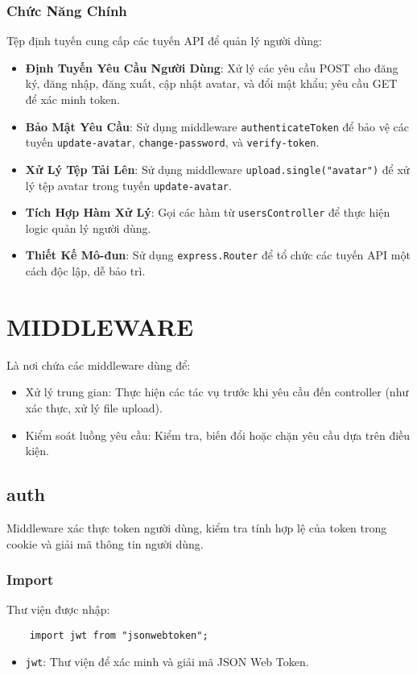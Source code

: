             \subsubsection{Chức Năng Chính}
                \hspace*{0.6cm}Tệp định tuyến cung cấp các tuyến API để quản lý người dùng:
                \begin{itemize}
                    \item \textbf{Định Tuyến Yêu Cầu Người Dùng}: Xử lý các yêu cầu POST cho đăng ký, đăng nhập, đăng xuất, cập nhật avatar, và đổi mật khẩu; yêu cầu GET để xác minh token.
                    \item \textbf{Bảo Mật Yêu Cầu}: Sử dụng middleware \texttt{authenticateToken} để bảo vệ các tuyến \texttt{update-avatar}, \texttt{change-password}, và \texttt{verify-token}.
                    \item \textbf{Xử Lý Tệp Tải Lên}: Sử dụng middleware \texttt{upload.single("avatar")} để xử lý tệp avatar trong tuyến \texttt{update-avatar}.
                    \item \textbf{Tích Hợp Hàm Xử Lý}: Gọi các hàm từ \texttt{usersController} để thực hiện logic quản lý người dùng.
                    \item \textbf{Thiết Kế Mô-đun}: Sử dụng \texttt{express.Router} để tổ chức các tuyến API một cách độc lập, dễ bảo trì.
                \end{itemize}
    \section{MIDDLEWARE}
        \hspace*{0.6cm}Là nơi chứa các middleware dùng để:
        \begin{itemize}
            \item Xử lý trung gian: Thực hiện các tác vụ trước khi yêu cầu đến controller (như xác thực, xử lý file upload).
            \item Kiểm soát luồng yêu cầu: Kiểm tra, biến đổi hoặc chặn yêu cầu dựa trên điều kiện.
        \end{itemize}
        \subsection{auth}
            \hspace*{0.6cm}Middleware xác thực token người dùng, kiểm tra tính hợp lệ của token trong cookie và giải mã thông tin người dùng.
            \subsubsection{Import}
                \hspace*{0.6cm}Thư viện được nhập:
                \begin{lstlisting}
    import jwt from "jsonwebtoken";
                \end{lstlisting}
                \begin{itemize}
                    \item \texttt{jwt}: Thư viện để xác minh và giải mã JSON Web Token.
                \end{itemize}

